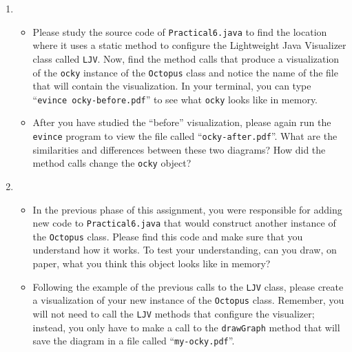 \begin{enumerate}
\item

\begin{itemize}


  \item Please study the source code of {\tt Practical6.java} to find the location where it uses a static method to
    configure the Lightweight Java Visualizer class called {\tt LJV}. Now, find the method calls that produce a
    visualization of the {\tt ocky} instance of the {\tt Octopus} class and notice the name of the file that will
    contain the visualization. In your terminal, you can type ``{\tt evince ocky-before.pdf}'' to see what {\tt ocky}
    looks like in memory.

  \item After you have studied the ``before'' visualization, please again run the {\tt evince} program to view the file
    called ``{\tt ocky-after.pdf}''. What are the similarities and differences between these two diagrams? How did the
    method calls change the {\tt ocky} object?

\end{itemize}

\item
  \begin{itemize}

    \item In the previous phase of this assignment, you were responsible for adding new code to {\tt Practical6.java}
      that would construct another instance of the {\tt Octopus} class.  Please find this code and make sure that you
      understand how it works. To test your understanding, can you draw, on paper, what you think this object looks like
      in memory?

    \item Following the example of the previous calls to the {\tt LJV} class, please create a visualization of your
      new instance of the {\tt Octopus} class. Remember, you will not need to call the {\tt LJV} methods that configure
      the visualizer; instead, you only have to make a call to the {\tt drawGraph} method that will save the diagram in
      a file called ``{\tt my-ocky.pdf}''.

  \end{itemize}
\end{enumerate}

